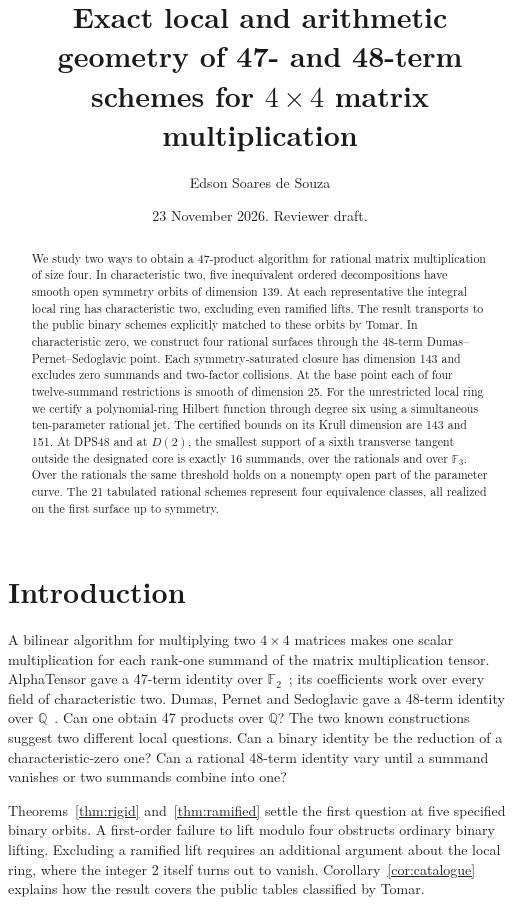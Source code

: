 \documentclass[11pt,reqno]{amsart}
\title[Local geometry of 47- and 48-term schemes]{Exact local and arithmetic geometry of 47- and 48-term schemes for \(4\times4\) matrix multiplication}
\author{Edson Soares de Souza}
\date{23 November 2026. Reviewer draft.}
\newcommand{\F}{\mathbb F}
\newcommand{\Q}{\mathbb Q}
\begin{document}
\begin{abstract}
We study two ways to obtain a 47-product algorithm for rational matrix multiplication of size four. In characteristic two, five inequivalent ordered decompositions have smooth open symmetry orbits of dimension 139. At each representative the integral local ring has characteristic two, excluding even ramified lifts. The result transports to the public binary schemes explicitly matched to these orbits by Tomar. In characteristic zero, we construct four rational surfaces through the 48-term Dumas--Pernet--Sedoglavic point. Each symmetry-saturated closure has dimension 143 and excludes zero summands and two-factor collisions. At the base point each of four twelve-summand restrictions is smooth of dimension 25. For the unrestricted local ring we certify a polynomial-ring Hilbert function through degree six using a simultaneous ten-parameter rational jet. The certified bounds on its Krull dimension are 143 and 151. At DPS48 and at \(D(2)\), the smallest support of a sixth transverse tangent outside the designated core is exactly 16 summands, over the rationals and over \(\F_3\). Over the rationals the same threshold holds on a nonempty open part of the parameter curve. The 21 tabulated rational schemes represent four equivalence classes, all realized on the first surface up to symmetry.
\end{abstract}
\maketitle
{}

\section{Introduction}
A bilinear algorithm for multiplying two \(4\times4\) matrices makes one scalar multiplication for each rank-one summand of the matrix multiplication tensor. AlphaTensor gave a 47-term identity over \(\F_2\)~\cite{at}; its coefficients work over every field of characteristic two. Dumas, Pernet and Sedoglavic gave a 48-term identity over \(\Q\)~\cite{dps}. Can one obtain 47 products over \(\Q\)? The two known constructions suggest two different local questions. Can a binary identity be the reduction of a characteristic-zero one? Can a rational 48-term identity vary until a summand vanishes or two summands combine into one?

Theorems~\ref{thm:rigid} and~\ref{thm:ramified} settle the first question at five specified binary orbits. A first-order failure to lift modulo four obstructs ordinary binary lifting. Excluding a ramified lift requires an additional argument about the local ring, where the integer \(2\) itself turns out to vanish. Corollary~\ref{cor:catalogue} explains how the result covers the public tables classified by Tomar.
\end{document}
